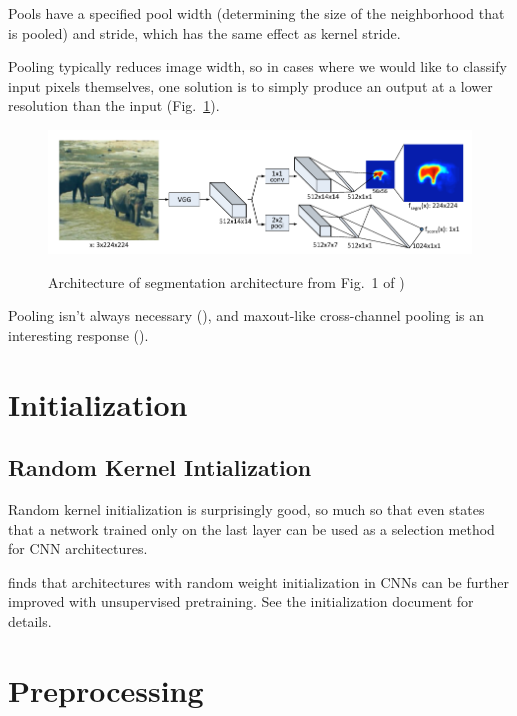 \documentclass{article}
\begin{document}
Pools have a specified pool width (determining the size of the neighborhood that is pooled) and stride, which has the same effect as kernel stride.

Pooling typically reduces image width, so in cases where we would like to classify input pixels themselves, one solution is to simply produce an output at a lower resolution than the input (Fig.~\ref{fig:pinheiro}).

\begin{figure}[!h]
\centering
{\includegraphics[width=\textwidth]{pinheiro.pdf}}
\caption{Architecture of segmentation architecture from Fig.~1 of )}
\label{fig:pinheiro}
\end{figure}

Pooling isn't always necessary (), and maxout-like cross-channel pooling is an interesting response ().

\section{Initialization}

\subsection{Random Kernel Intialization}

Random kernel initialization is surprisingly good, so much so that  even states that a network trained only on the last layer can be used as a selection method for CNN architectures.

 finds that architectures with random weight initialization in CNNs can be further improved with unsupervised pretraining. See the initialization document for details.

\section{Preprocessing}
\end{document}

